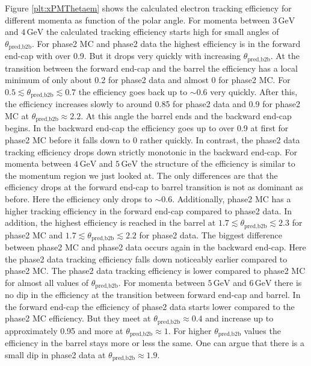 \documentclass[a4paper,11pt,twosided,final,german,openbib,pdftex,listof=totoc,bibliography=totoc]{scrbook}
\begin{document}
Figure \ref{plt:xPMThetaem} shows the calculated electron tracking efficiency for different momenta as function of the polar angle. For momenta between $3\,\textrm{GeV}$ and $4\,\textrm{GeV}$ the calculated tracking efficiency starts high for small angles of $\theta_{\textrm{pred,b2b}}$. For phase2 MC and phase2 data the highest efficiency is in the forward end-cap with over 0.9. But it drops very quickly with increasing $\theta_{\textrm{pred,b2b}}$. At the transition between the forward end-cap and the barrel the efficiency has a local minimum of only  about 0.2 for phase2 data and almost 0 for phase2 MC.
For $0.5 \lesssim \theta_{\textrm{pred,b2b}} \lesssim 0.7$ the efficiency goes back up to $\sim 0.6$ very quickly. After this, the efficiency increases slowly to around 0.85 for phase2 data and 0.9 for phase2 MC at $\theta_{\textrm{pred,b2b}} \approx 2.2$. At this angle the barrel ends and the backward end-cap begins. 
In the backward end-cap the efficiency goes up to over 0.9 at first for phase2 MC before it falls down to 0 rather quickly. In contrast, the phase2 data tracking efficiency drops down strictly monotonic in the backward end-cap. 
For momenta between $4\,\textrm{GeV}$ and $5\,\textrm{GeV}$ the structure of the efficiency is similar to the momentum region we just looked at. The only differences are that the efficiency drops at the forward end-cap to barrel transition is not as dominant as before. Here the efficiency only drops to $\sim 0.6$. Additionally, phase2 MC has a higher tracking efficiency in the forward end-cap compared to phase2 data.
In addition, the highest efficiency is reached in the barrel at $1.7 \lesssim \theta_{\textrm{pred,b2b}} \lesssim 2.3$ for phase2 MC and $1.7 \lesssim \theta_{\textrm{pred,b2b}}  \lesssim 2.2$ for phase2 data. The biggest difference between phase2 MC and phase2 data occurs again in the backward end-cap. Here the phase2 data tracking efficiency falls down noticeably earlier compared to phase2 MC. The phase2 data tracking efficiency is lower compared to phase2 MC for almost all values of $\theta_{\textrm{pred,b2b}}$.
For momenta between $5\,\textrm{GeV}$ and $6\,\textrm{GeV}$ there is no dip in the efficiency at the transition between forward end-cap and barrel. In the forward end-cap the efficiency of phase2 data starts lower compared to the phase2 MC efficiency. But they meet at $\theta_{\textrm{pred,b2b}} \approx 0.4$  and increase up to approximately 0.95 and more at $\theta_{\textrm{pred,b2b}} \approx 1$.
For higher $\theta_{\textrm{pred,b2b}}$ values the efficiency in the barrel stays more or less the same. One can argue that there is a small dip in phase2 data at $\theta_{\textrm{pred,b2b}} \approx 1.9$.
\end{document}
